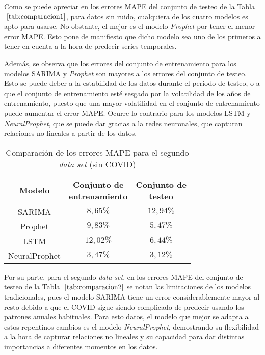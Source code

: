 \documentclass[12pt,twoside]{article}
\begin{document}
Como se puede apreciar en los errores MAPE del conjunto de testeo de la Tabla $~\ref{tab:comparacion1}$, para datos sin ruido, cualquiera de los cuatro modelos es apto para usarse. No obstante, el mejor es el modelo \textit{Prophet} por tener el menor error MAPE. Esto pone de manifiesto que dicho modelo sea uno de los primeros a tener en cuenta a la hora de predecir series temporales.

Además, se observa que los errores del conjunto de entrenamiento para los modelos SARIMA y \textit{Prophet} son mayores a los errores del conjunto de testeo. Esto se puede deber a la estabilidad de los datos durante el periodo de testeo, o a que el conjunto de entrenamiento esté sesgado por la volatilidad de los años de entrenamiento, puesto que una mayor volatilidad en el conjunto de entrenamiento puede aumentar el error MAPE. Ocurre lo contrario para los modelos LSTM y \textit{NeuralProphet}, que se puede dar gracias a la redes neuronales, que capturan relaciones no lineales a partir de los datos.

\begin{table}[h]
\centering
\begin{tabular}{|c|c|c|}
\hline
\textbf{Modelo} & \makecell{\textbf{Conjunto de} \\ \textbf{entrenamiento}} & \makecell{\textbf{Conjunto de} \\ \textbf{testeo}} \\ \hline
SARIMA & $8,65\%$ & $12,94\%$  \\ \hline
Prophet & $9,83\%$ & $5,47\%$ \\ \hline
LSTM & $12,02\%$ & $6,44\%$ \\ \hline
NeuralProphet & $3,47\%$ & $3,12\%$ \\ \hline
\end{tabular}
\caption{Comparación de los errores MAPE para el segundo \textit{data set} (sin COVID)}
\label{tab:comparacion2}
\end{table}

Por su parte, para el segundo \textit{data set}, en los errores MAPE del conjunto de testeo de la Tabla $~\ref{tab:comparacion2}$ se notan las limitaciones de los modelos tradicionales, pues el modelo SARIMA tiene un error considerablemente mayor al resto debido a que el COVID sigue siendo complicado de predecir usando los patrones anuales habituales. Para esto datos, el modelo que mejor se adapta a estos repentinos cambios es el modelo \textit{NeuralProphet}, demostrando su flexibilidad a la hora de capturar relaciones no lineales y su capacidad para dar distintas importancias a diferentes momentos en los datos.
\end{document}
